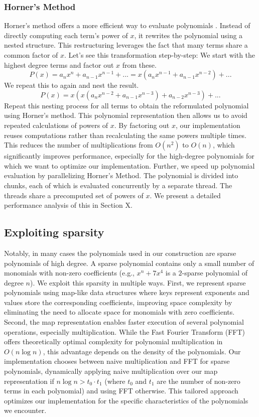 \subsubsection{Horner's Method}
Horner's method offers a more efficient way to evaluate polynomials \cite{horner1819xxi}. Instead of directly computing each term's power of $x$, it rewrites the polynomial using a nested structure. This restructuring leverages the fact that many terms share a common factor of $x$. Let's see this transformation step-by-step: We start with the highest degree terms and factor out $x$ from these.
$$
P(x) = a_n x^n + a_{n-1} x^{n-1} + ... = x(a_n x^{n-1} + a_{n-1} x^{n-2}) + ...
$$
We repeat this to again and nest the result.
$$
P(x) = x(x(a_n x^{n-2} + a_{n-1} x^{n-3}) + a_{n-2}x^{n-3}) + ...
$$
Repeat this nesting process for all terms to obtain the reformulated polynomial using Horner's method. This polynomial representation then allows us to avoid repeated calculations of powers of $x$. By factoring out $x$, our implementation reuses computations rather than recalculating the same powers multiple times. This reduces the number of multiplications from $O(n^2)$ to $O(n)$, which significantly improves performance, especially for the high-degree polynomials for which we want to optimize our implementation. Further, we speed up polynomial evaluation by parallelizing Horner's Method. The polynomial is divided into chunks, each of which is evaluated concurrently by a separate thread. The threads share a precomputed set of powers of $x$. We present a detailed performance analysis of this in Section X.

\subsection{Exploiting sparsity}
Notably, in many cases the polynomials used in our construction are sparse polynomials of high degree. A sparse polynomial contains only a small number of monomials with non-zero coefficients (e.g., $x^n + 7x^4$ is a $2$-sparse polynomial of degree $n$). We exploit this sparsity in multiple ways. First, we represent sparse polynomials using map-like data structures where keys represent exponents and values store the corresponding coefficients, improving space complexity by eliminating the need to allocate space for monomials with zero coefficients. Second, the map representation enables faster execution of several polynomial operations, especially multiplication. While the Fast Fourier Transform (FFT) offers theoretically optimal complexity for polynomial multiplication in $O(n \log n)$, this advantage depends on the density of the polynomials. Our implementation chooses between naive multiplication and FFT for sparse polynomials, dynamically applying naive multiplication over our map representation if $n\log n > t_0 \cdot t_1$ (where $t_0$ and $t_1$ are the number of non-zero terms in each polynomial) and using FFT otherwise. This tailored approach optimizes our implementation for the specific characteristics of the polynomials we encounter. 

